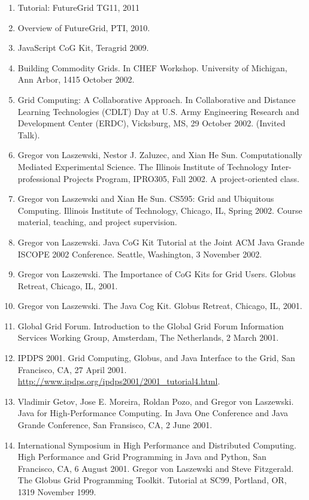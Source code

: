 \documentclass{article}
\begin{document}
\begin{enumerate}
\item  Tutorial: FutureGrid TG11, 2011
\item  Overview of FutureGrid, PTI, 2010.
\item  JavaScript CoG Kit, Teragrid 2009. 
\item  Building Commodity Grids. In CHEF Workshop. University of Michigan, Ann Arbor, 1415 October 2002. 
\item  Grid Computing: A Collaborative Approach. In Collaborative and Distance Learning Technologies (CDLT) Day at U.S. Army Engineering Research and Development Center (ERDC), Vicksburg, MS, 29 October 2002. (Invited Talk). 
\item  Gregor von Laszewski, Nestor J. Zaluzec, and Xian He Sun. Computationally Mediated Experimental Science. The Illinois Institute of Technology Inter-professional Projects Program, IPRO305, Fall 2002. A project-oriented class. 
\item  Gregor von Laszewski and Xian He Sun. CS595: Grid and Ubiquitous Computing. Illinois Institute of Technology, Chicago, IL, Spring 2002. Course material, teaching, and project supervision. 
\item  Gregor von Laszewski. Java CoG Kit Tutorial at the Joint ACM Java Grande ISCOPE 2002 Conference. Seattle, Washington, 3 November 2002. 
\item  Gregor von Laszewski. The Importance of CoG Kits for Grid Users. Globus Retreat, Chicago, IL, 2001. 
\item  Gregor von Laszewski. The Java Cog Kit. Globus Retreat, Chicago, IL, 2001. 
\item  Global Grid Forum. Introduction to the Global Grid Forum Information Services Working Group, Amsterdam, The Netherlands, 2 March 2001. 
\item  IPDPS 2001. Grid Computing, Globus, and Java Interface to the Grid, San Francisco, CA, 27 April 2001. \url{http://www.ipdps.org/ipdps2001/2001_tutorial4.html}.
\item  Vladimir Getov, Jose E. Moreira, Roldan Pozo, and Gregor von Laszewski. Java for High-Performance Computing. In Java One Conference and Java Grande Conference, San Fransisco, CA, 2 June 2001. 
\item  International Symposium in High Performance and Distributed Computing. High Performance and Grid Programming in Java and Python, San Francisco, CA, 6 August 2001. Gregor von Laszewski and Steve Fitzgerald. The Globus Grid Programming Toolkit. Tutorial at SC99, Portland, OR, 1319 November 1999. 

\end{enumerate}
\end{document}
